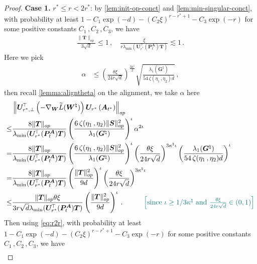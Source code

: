 \begin{proof}
    {\bf Case 1.} $r^*\leq r < 2r^*$: by \cref{lem:init-op-conct} and \cref{lem:min-singular-conct}, with probability at least $1-C_1 \exp(-d)-(C_2 \xi)^{r-r^*+1}-C_3\exp(-r)$ for some positive constants $C_1\,,C_2\,,C_3$, we have
    \begin{align}\label{eq:r2r}
        \frac{\|\bm T\|_{op}}{3\sqrt{d}} \leq 1\,,\quad \frac{\xi}{r\lambda_{\min}(\bm U^{\!\top}_{r^*}(\bm P_t^{\bm A}) \bm T)} \lesssim 1\,.
    \end{align}
    Here we pick
    \begin{align*}
        \alpha & \leq \left(\frac{\theta \xi}{24r\sqrt{d}}\right)^{\frac{3\kappa^\natural}{2}}\sqrt{\frac{\lambda_1({\bm G}^{\natural})}{54\,\zeta(\eta_1\,,\eta_2)d}}\,,
    \end{align*}
    then recall \cref{lemma:aligntheta} on the alignment, we take $\alpha$ here
    \begin{align*}
        & \left\|\bm U^{\!\top}_{r^*,\perp}\left(-\nabla_{\bm W}\widetilde{L}(\bm W^\natural)\right)\bm U_{r^*}\left(\bm A_{t^*}\right)\right\|_{op}\\
        \leq & \frac{8\|\bm T\|_{op}}{\lambda_{\min}(\bm U^{\!\top}_{r^*}(\bm P_t^{\bm A}) \bm T)} \left(\frac{6\,\zeta(\eta_1\,,\eta_2) \|\bm S\|_{op}^2}{\lambda_1({\bm G}^{\natural})}\right)^\iota \alpha^{2\iota}\\
        = & \frac{8\|\bm T\|_{op}}{\lambda_{\min}(\bm U^{\!\top}_{r^*}(\bm P_t^{\bm A}) \bm T)} \left(\frac{6\,\zeta(\eta_1\,,\eta_2) \|\bm S\|_{op}^2}{\lambda_1({\bm G}^{\natural})}\right)^\iota \left(\frac{\theta \xi}{24r\sqrt{d}}\right)^{3\kappa^\natural\iota}\left(\frac{\lambda_1({\bm G}^{\natural})}{54\,\zeta(\eta_1\,,\eta_2)d}\right)^\iota\\
        = & \frac{8\|\bm T\|_{op}}{\lambda_{\min}(\bm U^{\!\top}_{r^*}(\bm P_t^{\bm A}) \bm T)} \left(\frac{\|\bm T\|_{op}^2}{9d}\right)^\iota \left(\frac{\theta \xi}{24r\sqrt{d}}\right)^{3\kappa^\natural\iota}\\
        \leq & \frac{\|\bm T\|_{op}\theta \xi}{3r\sqrt{d}\lambda_{\min}(\bm U^{\!\top}_{r^*}(\bm P_t^{\bm A}) \bm T)} \left(\frac{\|\bm T\|_{op}^2}{9d}\right)^\iota\,.\quad \tag*{\color{teal}$\left[\text{since }\iota \geq 1/3\kappa^\natural\text{ and }\frac{\theta \xi}{24r\sqrt{d}}\in(0,1)\right]$}\\
    \end{align*}
    Then using \cref{eq:r2r}, with probability at least $1-C_1 \exp(-d)-(C_2 \xi)^{r-r^*+1}-C_3\exp(-r)$ for some positive constants $C_1\,,C_2\,,C_3$, we have
    \begin{align*}

\end{align*}
\end{proof}
